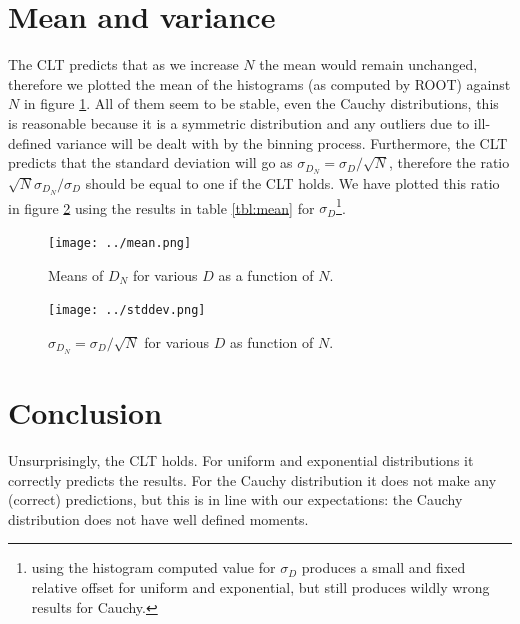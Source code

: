 \documentclass[notitlepage, 12pt, a4paper, twoside, titlepage]{article}
\begin{document}
\section{Mean and variance}
The CLT predicts that as we increase $N$ the mean would remain unchanged, therefore we plotted the mean of the histograms (as computed by ROOT) against $N$ in figure \ref{fig:mean}. All of them seem to be stable, even the Cauchy distributions, this is reasonable because it is a symmetric distribution and any outliers
due to ill-defined variance will be dealt with by the binning process.
Furthermore, the CLT predicts that the standard deviation will go as $\sigma_{D_N} = \sigma_D/\sqrt{N}$, therefore the ratio $\sqrt{N}\sigma_{D_N}/\sigma_{D}$ should be equal to one if the CLT holds. We have plotted this ratio in figure \ref{fig:stddev} using the results in table \ref{tbl:mean} for $\sigma_D$\footnote{using the histogram computed value for $\sigma_D$ produces a small and fixed relative offset for uniform and exponential, but still produces wildly wrong results for Cauchy.}.

\begin{figure}[h!]
  \texttt{[image: ../mean.png]}
  \caption{Means of $D_N$ for various $D$ as a function of $N$.}
  \label{fig:mean}
\end{figure}

\begin{figure}[h!]
  \texttt{[image: ../stddev.png]}
  \caption{ $\sigma_{D_N} = \sigma_D/\sqrt{N}$ for various $D$ as function of $N$.}
  \label{fig:stddev}
\end{figure}

\section{Conclusion}
Unsurprisingly, the CLT holds. For uniform and exponential distributions it correctly predicts the results. For the Cauchy distribution it does not make any (correct) predictions, but this is in line with our expectations: the Cauchy distribution does not have well defined moments.
\end{document}
